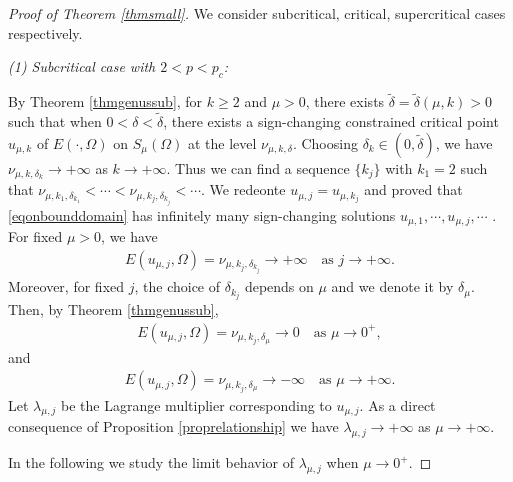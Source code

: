 \documentclass[10pt,a4paper]{amsart}
\newcommand{\la}{\lambda}
\begin{document}
\begin{proof}[Proof of Theorem \ref{thmsmall}]
	We consider subcritical, critical, supercritical cases respectively.
	
	\vskip0.1in
	\emph{(1) Subcritical case with $2 < p < p_c$: }
	
	By Theorem \ref{thmgenussub}, for $k \geq 2$ and $\mu > 0$, there exists $\tilde \delta = \tilde \delta(\mu,k) > 0$ such that when $0 < \delta < \tilde \delta$, there exists a sign-changing constrained critical point $u_{\mu,k}$ of $E(\cdot,\Omega)$ on $S_\mu(\Omega)$ at the level $\nu_{\mu,k,\delta}$. Choosing $\delta_k \in (0,\tilde \delta)$, we have $\nu_{\mu,k,\delta_k} \to +\infty$ as $k \to +\infty$. Thus we can find a sequence $\{k_j\}$ with $k_1 = 2$ such that $\nu_{\mu,k_1,\delta_{k_1}} < \cdots < \nu_{\mu,k_j,\delta_{k_j}} < \cdots$. We redeonte $u_{\mu,j} = u_{\mu,k_j}$ and proved that \eqref{eqonbounddomain} has infinitely many sign-changing solutions $u_{\mu,1}, \cdots, u_{\mu,j}, \cdots$ . For fixed $\mu > 0$, we have
	\begin{align*}
		E(u_{\mu,j},\Omega) = \nu_{\mu,k_j,\delta_{k_j}} \to +\infty \quad \text{as } j \to +\infty.
	\end{align*}
	Moreover, for fixed $j$, the choice of $\delta_{k_j}$ depends on $\mu$ and we denote it by $\delta_\mu$. Then, by Theorem \ref{thmgenussub},
	\begin{align*}
		E(u_{\mu,j},\Omega) = \nu_{\mu,k_j,\delta_{\mu}} \to 0 \quad \text{as } \mu \to 0^+,
	\end{align*}
    and
    \begin{align*}
    	E(u_{\mu,j},\Omega) = \nu_{\mu,k_j,\delta_{\mu}} \to -\infty \quad \text{as } \mu \to +\infty.
    \end{align*}
    Let $\la_{\mu,j}$ be the Lagrange multiplier corresponding to $u_{\mu,j}$. As a direct consequence of Proposition \ref{proprelationship} we have $\la_{\mu,j} \to +\infty$ as $\mu \to +\infty$.

    In the following we study the limit behavior of $\la_{\mu,j}$ when $\mu \to 0^+$.


\end{proof}
\end{document}
